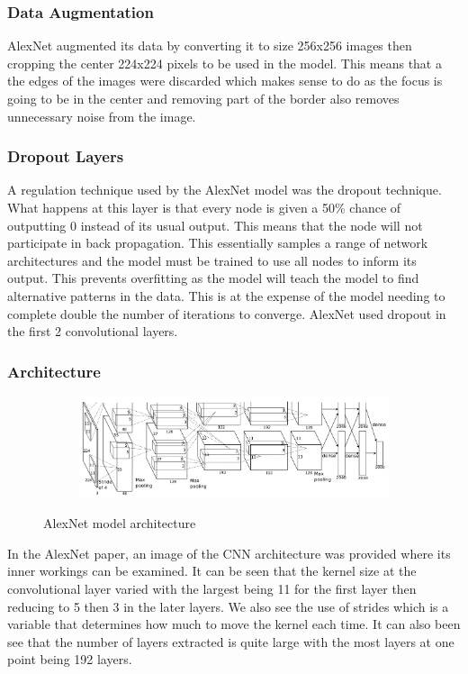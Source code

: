 \documentclass[../main.tex]{subfiles}
\begin{document}
\subsubsection{Data Augmentation}
AlexNet augmented its data by converting it to size 256x256 images then cropping the center 224x224 pixels to be used in the model. This means that a the edges of the images were discarded which makes sense to do as the focus is going to be in the center and removing part of the border also removes unnecessary noise from the image.  \cite{alexnet}

\subsubsection{Dropout Layers}
A regulation technique used by the AlexNet model was the dropout technique. What happens at this layer is that every node is given a 50\% chance of outputting 0 instead of its usual output. This means that the node will not participate in back propagation. This essentially samples a range of network architectures and the model must be trained to use all nodes to inform its output. This prevents overfitting as the model will teach the model to find alternative patterns in the data. This is at the expense of the model needing to complete double the number of iterations to converge. AlexNet used dropout in the first 2 convolutional layers. \cite{alexnet}

\subsubsection{Architecture}
\begin{figure}[h!]
  \centering
  \begin{subfigure}[b]{0.8\linewidth}
    \includegraphics[width=\linewidth]{alexnet.png}
  \end{subfigure}
  \caption{AlexNet model architecture}
  \label{fig:alexnet}
\end{figure}

In the AlexNet paper, an image of the CNN architecture was provided where its inner workings can be examined. It can be seen that the kernel size at the convolutional layer varied with the largest being 11 for the first layer then reducing to 5 then 3 in the later layers. We also see the use of strides which is a variable that determines how much to move the kernel each time. It can also been see that the number of layers extracted is quite large with the most layers at one point being 192 layers.
\end{document}
